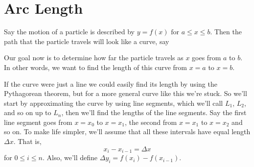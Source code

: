 \documentclass[10pt,]{book}
\numberwithin{equation}{section}
\begin{document}
\section[{Arc Length}]{Arc Length}\label{section-arc-length}
\hypertarget{p-649}{}%
Say the motion of a particle is described by \(y = f(x) \text{ for } a \leq x \leq b.\) Then the path that the particle travels will look like a curve, say \begin{figure}
\centering
{
}
\end{figure}
%
\par
\hypertarget{p-650}{}%
Our goal now is to determine how far the particle travels as \(x\) goes from \(a\) to \(b\). In other words, we want to find the length of this curve from \(x=a\) to \(x=b\).%
\par
\hypertarget{p-651}{}%
If the curve were just a line we could easily find its length by using the Pythagorean theorem, but for a more general curve like this we're stuck. So we'll start by approximating the curve by using line segments, which we'll call \(L_1\), \(L_2\), and so on up to \(L_{n}\), then we'll find the lengths of the line segments. Say the first line segment goes from \(x=x_0\) to \(x=x_1\), the second from \(x=x_1\) to \(x=x_2\) and so on. To make life simpler, we'll assume that all these intervals have equal length \(\Delta x\). That is,%
\begin{equation*}
x_{i} - x_{i-1}  = \Delta x
\end{equation*}
for \(0 \leq i\leq n\). Also, we'll define \(\Delta y_{i} = f(x_{i}) - f(x_{i-1})\).%
\end{document}
